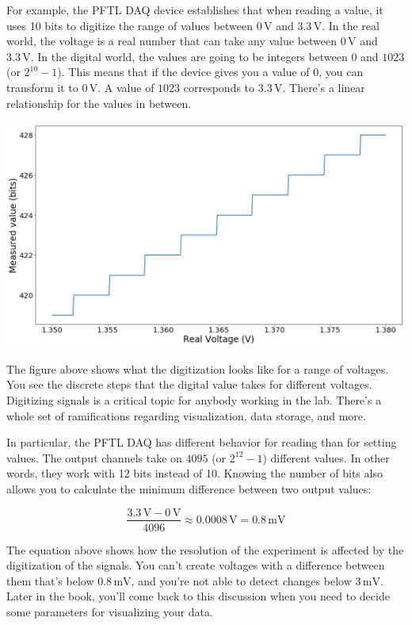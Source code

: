 For example, the {PFTL DAQ} device establishes that when reading a value, it uses 10 bits to digitize the range of values between $0\,\textrm{V}$ and $3.3\,\textrm{V}$. In the real world, the voltage is a real number that can take any value between $0\,\textrm{V}$ and $3.3\,\textrm{V}$. In the digital world, the values are going to be integers between $0$ and $1023$ (or $2^{10}-1$). This means that if the device gives you a value of $0$, you can transform it to $0\,\textrm{V}$. A value of $1023$ corresponds to $3.3\,\textrm{V}$. There's a linear relationship for the values in between.

\begin{center}
\includegraphics[width=.6\textwidth]{images/Chapter_03/digitalization.png}
\end{center}

The figure above shows what the digitization looks like for a range of voltages. You see the discrete steps that the digital value takes for different voltages. Digitizing signals is a critical topic for anybody working in the lab. There's a whole set of ramifications regarding visualization, data storage, and more.

In particular, the {PFTL DAQ} has different behavior for reading than for setting values. The output channels take on $4095$ (or $2^{12}-1$) different values. In other words, they work with 12 bits instead of 10. Knowing the number of bits also allows you to calculate the minimum difference between two output values:

\begin{equation}
 \frac{3.3\,\textrm{V} - 0\,\textrm{V}}{4096} \approx 0.0008\,\textrm{V} = 0.8\,\textrm{mV}
\end{equation}

The equation above shows how the resolution of the experiment is affected by the digitization of the signals. You can't create voltages with a difference between them that's below $0.8\,\textrm{mV}$, and you're not able to detect changes below $3\,\textrm{mV}$. Later in the book, you'll come back to this discussion when you need to decide some parameters for visualizing your data.

